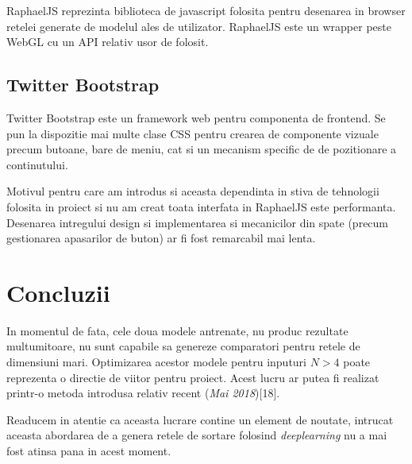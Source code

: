 \documentclass[12pt]{article}
\begin{document}
RaphaelJS reprezinta biblioteca de javascript folosita pentru desenarea in browser retelei generate de modelul ales de utilizator. RaphaelJS este un wrapper peste WebGL cu un API relativ usor de folosit.


\subsection{Twitter Bootstrap}

Twitter Bootstrap este un framework web pentru componenta de frontend. Se pun la dispozitie mai multe clase CSS pentru crearea de componente vizuale precum butoane, bare de meniu, cat si un mecanism specific de de pozitionare a continutului.

Motivul pentru care am introdus si aceasta dependinta in stiva de tehnologii folosita in proiect si nu am creat toata interfata in RaphaelJS este performanta. Desenarea intregului design si implementarea si mecanicilor din spate (precum gestionarea apasarilor de buton) ar fi fost remarcabil mai lenta.

\section{Concluzii}

 In momentul de fata, cele doua modele antrenate, nu produc rezultate multumitoare, nu sunt capabile sa genereze comparatori pentru retele de dimensiuni mari. Optimizarea acestor modele pentru inputuri $N>4$ poate reprezenta o directie de viitor pentru proiect. Acest lucru ar putea fi realizat printr-o metoda introdusa relativ recent (\textit{Mai 2018})[18].

Readucem in atentie ca aceasta lucrare contine un element de noutate, intrucat aceasta abordarea de a genera retele de sortare folosind \textit{deeplearning} nu a mai fost atinsa pana in acest moment. 
  
 
\end{document}
